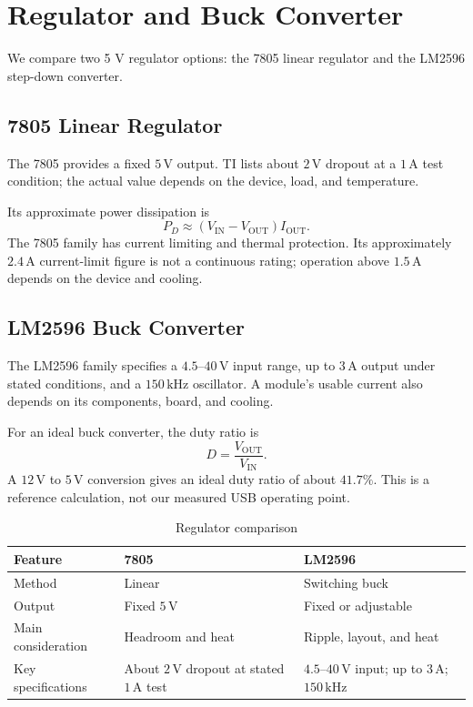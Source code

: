 \documentclass[journal,12pt,twocolumn]{IEEEtran}
\theoremstyle{definition}
\theoremstyle{remark}
\numberwithin{equation}{section}
\begin{document}
\section{Regulator and Buck Converter}
We compare two 5 V regulator options: the 7805 linear regulator and
the LM2596 step-down converter.

\subsection{7805 Linear Regulator}
The 7805 provides a fixed $5\,\mathrm{V}$ output. TI lists about
$2\,\mathrm{V}$ dropout at a $1\,\mathrm{A}$ test condition; the
actual value depends on the device, load, and temperature.

Its approximate power dissipation is
\[
P_D\approx(V_{\mathrm{IN}}-V_{\mathrm{OUT}})I_{\mathrm{OUT}}.
\]
The 7805 family has current limiting and thermal protection. Its
approximately $2.4\,\mathrm{A}$ current-limit figure is not a
continuous rating; operation above $1.5\,\mathrm{A}$ depends on the
device and cooling.

\subsection{LM2596 Buck Converter}
The LM2596 family specifies a $4.5$--$40\,\mathrm{V}$ input range,
up to $3\,\mathrm{A}$ output under stated conditions, and a
$150\,\mathrm{kHz}$ oscillator. A module's usable current also
depends on its components, board, and cooling.

For an ideal buck converter, the duty ratio is
\[
D=\frac{V_{\mathrm{OUT}}}{V_{\mathrm{IN}}}.
\]
A $12\,\mathrm{V}$ to $5\,\mathrm{V}$ conversion gives an ideal
duty ratio of about $41.7\%$. This is a reference calculation, not
our measured USB operating point.

\begin{table}[H]
\centering
\caption{Regulator comparison}
\label{tab:regulator-comparison}
\small
\begin{tabular}{|p{}|p{}|p{}|}
\hline
\textbf{Feature} & \textbf{7805} & \textbf{LM2596}\\ \hline
Method & Linear & Switching buck\\
Output & Fixed $5\,\mathrm{V}$ & Fixed or adjustable\\
Main consideration & Headroom and heat & Ripple, layout, and heat\\
Key specifications & About $2\,\mathrm{V}$ dropout at stated $1\,\mathrm{A}$ test & $4.5$--$40\,\mathrm{V}$ input; up to $3\,\mathrm{A}$; $150\,\mathrm{kHz}$\\
\hline
\end{tabular}
\end{table}
\end{document}
